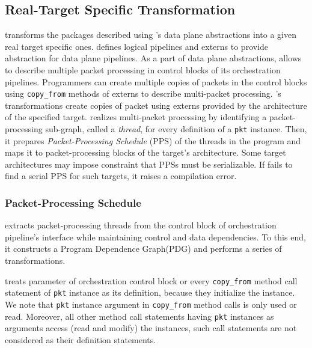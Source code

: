 \documentclass[letterpaper,twocolumn,10pt]{article}
\begin{document}
\subsection{Real-Target Specific Transformation}
\ucomp transforms the packages described using \ulang's data plane abstractions into a given real target specific ones.
\uarch defines logical pipelines and externs to provide abstraction for data plane pipelines.
As a part of data plane abstractions, \uarch allows to describe multiple packet processing in control blocks of its orchestration pipelines.
Programmers can create multiple copies of packets in the control blocks using \texttt{copy\_from} methods of \uarch externs to describe multi-packet processing.
\ucomp's transformations create copies of packet using externs provided by the architecture of the specified target.
\ucomp realizes multi-packet processing by identifying a packet-processing sub-graph, called a \emph{thread}, for every definition of a \texttt{pkt} instance.
Then, it prepares \emph{Packet-Processing Schedule} (PPS) of the threads in the program and maps it to packet-processing blocks of the target's architecture.
Some target architectures may impose constraint that PPSs must be serializable.
If \ucomp fails to find a serial PPS for such targets, it raises a compilation error. 


\subsubsection{Packet-Processing Schedule}
\ucomp extracts packet-processing threads from the control block of orchestration pipeline's interface while maintaining control and data dependencies.
To this end, it constructs a Program Dependence Graph(PDG) \cite{Ferrante:1987:PDG:24039.24041} and performs a series of transformations.

\ucomp treats parameter of orchestration control block or every \texttt{copy\_from} method call statement of \texttt{pkt} instance as its definition, because they initialize the instance.
We note that \texttt{pkt} instance argument in \texttt{copy\_from} method calls is only used or read.
Moreover, all other method call statements having \texttt{pkt} instances as arguments access (read and modify) the instances, such call statements are not considered as their definition statements.
\end{document}
